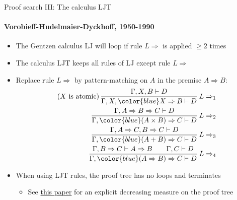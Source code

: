 \documentclass[english]{beamer}
\begin{document}
\begin{frame}{Proof search III: The calculus LJT}


\framesubtitle{Vorobieff-Hudelmaier-Dyckhoff, 1950-1990}
\begin{itemize}
\item The Gentzen calculus LJ will loop if rule $L\Rightarrow$ is applied
$\geq2$ times
\item The calculus LJT keeps all rules of LJ except rule $L\Rightarrow$
\item Replace rule $L\Rightarrow$ by pattern-matching on $A$ in the premise
$A\Rightarrow B$:
\begin{align*}
\text{(}X\text{ is atomic)\,}\frac{\Gamma,X,B\vdash D}{\Gamma,X,{\color{blue}X\Rightarrow B}\vdash D}\:L\Rightarrow_{1}\\
\frac{\Gamma,A\Rightarrow B\Rightarrow C\vdash D}{\Gamma,{\color{blue}(A\times B)\Rightarrow C}\vdash D}\:L\Rightarrow_{2}\\
\frac{\Gamma,A\Rightarrow C,B\Rightarrow C\vdash D}{\Gamma,{\color{blue}(A+B)\Rightarrow C}\vdash D}\:L\Rightarrow_{3}\\
\frac{\Gamma,B\Rightarrow C\vdash A\Rightarrow B\quad\quad\Gamma,C\vdash D}{\Gamma,{\color{blue}(A\Rightarrow B)\Rightarrow C}\vdash D}\:L\Rightarrow_{4}
\end{align*}
\item When using LJT rules, the proof tree has no loops and terminates
\begin{itemize}
\item See \href{http://citeseer.ist.psu.edu/viewdoc/summary?doi=10.1.1.35.2618}{this paper}
for an explicit decreasing measure on the proof tree
\end{itemize}
\end{itemize}
\end{frame}
\end{document}
